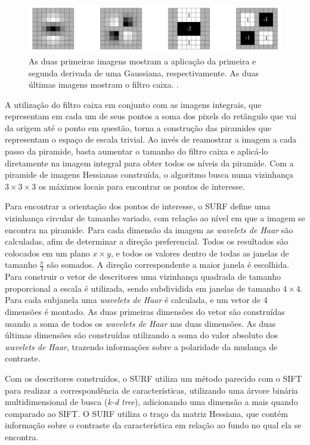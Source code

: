 \begin{figure}[H]
    \centering
    \includegraphics[width=1\textwidth]{figuras/boxFilter.png}
    \caption{As duas primeiras imagens mostram a aplicação da primeira e segunda derivada de uma Gaussiana, 
             respectivamente. As duas últimas imagens mostram o filtro caixa. \cite{surfHolroyd}.}
    \label{fig:box}
\end{figure}
  
  A utilização do filtro caixa em conjunto com as imagens integrais, que representam em cada um de seus pontos a soma
dos pixels do retângulo que vai da origem até o ponto em questão, torna a construção das piramides que representam o
espaço de escala trivial. Ao invés de reamostrar a imagem a cada passo da piramide, basta aumentar o tamanho do filtro
caixa e aplicá-lo diretamente na imagem integral para obter todos os níveis da piramide. Com a piramide de imagens
Hessianas construída, o algoritmo busca numa vizinhança $3 \times 3 \times 3$ os máximos locais para encontrar os 
pontos de interesse.

  Para encontrar a orientação dos pontos de interesse, o SURF define uma vizinhança circular de tamanho variado, com
relação ao nível em que a imagem se encontra na piramide. Para cada dimensão da imagem as \textit{wavelets de Haar} são
calculadas, afim de determinar a direção preferencial. Todos os resultados são colocados em um plano $x \times y$, e 
todos os valores dentro de todas as janelas de tamanho $\frac{\pi}{3}$ são somados. A direção correspondente a maior 
janela é escolhida. Para construir o vetor de descritores uma vizinhança quadrada de tamanho proporcional a escala é 
utilizada, sendo subdividida em janelas de tamanho $4 \times 4$. Para cada subjanela uma \textit{wavelets de Haar} é 
calculada, e um vetor de 4 dimensões é montado. As duas primeiras dimensões do vetor são construídas usando a soma de 
todos os \textit{wavelets de Haar} nas duas dimensões. As duas últimas dimensões são construídas utilizando a soma do 
valor absoluto dos \textit{wavelets de Haar}, trazendo informações sobre a polaridade da mudança de contraste.

  Com os descritores construídos, o SURF utiliza um método parecido com o SIFT para realizar a correspondência de 
características, utilizando uma árvore binária multidimensional de busca (\textit{k-d tree}), adicionando uma dimensão a 
mais quando comparado ao SIFT. O SURF utiliza o traço da matriz Hessiana, que contém informação sobre o contraste da 
característica em relação ao fundo no qual ela se encontra.

